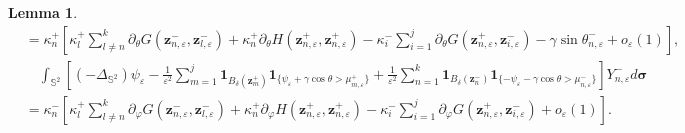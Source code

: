 \documentclass[12pt,reqno]{amsart}
\numberwithin{equation}{section}
\newtheorem{lemma}[theorem]{Lemma}
\theoremstyle{definition}
\theoremstyle{remark}
\begin{document}
\begin{lemma}
\begin{align*}
			&=\kappa_n^+\left[\kappa_l^+\sum\limits_{l\neq n}^k\partial_\theta G(\boldsymbol z_{n,\varepsilon}^-,\boldsymbol z_{l,\varepsilon}^-)+ \kappa_n^+ \partial_\theta H(\boldsymbol z_{n,\varepsilon}^+,\boldsymbol z_{n,\varepsilon}^+)-\kappa_i^-\sum\limits_{i=1}^j\partial_\theta G(\boldsymbol z_{n,\varepsilon}^+,\boldsymbol z_{i,\varepsilon}^-)-\gamma\sin\theta_{n,\varepsilon}^-+o_\varepsilon(1)\right],
		\end{align*}
		\begin{align*}
			&\quad\int_{\mathbb S^2}\left[(-\Delta_{\mathbb S^2})\psi_\varepsilon-\frac{1}{\varepsilon^2}\sum_{m=1}^j\boldsymbol1_{B_\delta(\boldsymbol z_m^+)}\boldsymbol1_{\{\psi_\varepsilon+\gamma\cos\theta>\mu_{m,\varepsilon}^+\}}+\frac{1}{\varepsilon^2}\sum_{n=1}^k\boldsymbol1_{B_\delta(\boldsymbol z_n^-)}\boldsymbol1_{\{-\psi_\varepsilon-\gamma\cos\theta>\mu_{n,\varepsilon}^-\}}\right]Y_{n,\varepsilon}^- d\boldsymbol\sigma\\
			&=\kappa_n^-\left[\kappa_l^+\sum\limits_{l\neq n}^k\partial_\varphi G(\boldsymbol z_{n,\varepsilon}^-,\boldsymbol z_{l,\varepsilon}^-)+ \kappa_n^+ \partial_\varphi H(\boldsymbol z_{n,\varepsilon}^+,\boldsymbol z_{n,\varepsilon}^+)-\kappa_i^-\sum\limits_{i=1}^j\partial_\varphi G(\boldsymbol z_{n,\varepsilon}^+,\boldsymbol z_{i,\varepsilon}^-)+o_\varepsilon(1)\right].
		\end{align*}
	\end{lemma}
	
\end{document}
